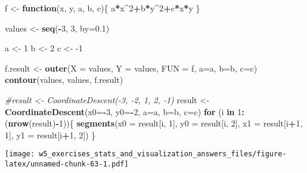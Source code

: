 \documentclass[]{article}
\newenvironment{Shaded}{\begin{snugshade}}{\end{snugshade}}
\newcommand{\CommentTok}[1]{\textcolor[rgb]{0.56,0.35,0.01}{\textit{#1}}}
\newcommand{\ControlFlowTok}[1]{\textcolor[rgb]{0.13,0.29,0.53}{\textbf{#1}}}
\newcommand{\DataTypeTok}[1]{\textcolor[rgb]{0.13,0.29,0.53}{#1}}
\newcommand{\DecValTok}[1]{\textcolor[rgb]{0.00,0.00,0.81}{#1}}
\newcommand{\FloatTok}[1]{\textcolor[rgb]{0.00,0.00,0.81}{#1}}
\newcommand{\KeywordTok}[1]{\textcolor[rgb]{0.13,0.29,0.53}{\textbf{#1}}}
\newcommand{\NormalTok}[1]{#1}
\newcommand{\OperatorTok}[1]{\textcolor[rgb]{0.81,0.36,0.00}{\textbf{#1}}}
\newcommand{\StringTok}[1]{\textcolor[rgb]{0.31,0.60,0.02}{#1}}
\begin{document}
\begin{Shaded}
\begin{Highlighting}[]
\NormalTok{f <-}\StringTok{ }\ControlFlowTok{function}\NormalTok{(x, y, a, b, c)\{}
\NormalTok{  a}\OperatorTok{*}\NormalTok{x}\OperatorTok{^}\DecValTok{2}\OperatorTok{+}\NormalTok{b}\OperatorTok{*}\NormalTok{y}\OperatorTok{^}\DecValTok{2}\OperatorTok{+}\NormalTok{c}\OperatorTok{*}\NormalTok{x}\OperatorTok{*}\NormalTok{y}
\NormalTok{\}}

\NormalTok{values <-}\StringTok{ }\KeywordTok{seq}\NormalTok{(}\OperatorTok{-}\DecValTok{3}\NormalTok{, }\DecValTok{3}\NormalTok{, }\DataTypeTok{by=}\FloatTok{0.1}\NormalTok{)}
\end{Highlighting}
\end{Shaded}

\begin{Shaded}
\begin{Highlighting}[]
\NormalTok{a <-}\StringTok{ }\DecValTok{1} 
\NormalTok{b <-}\StringTok{ }\DecValTok{2}
\NormalTok{c <-}\StringTok{ }\DecValTok{-1}

\NormalTok{f.result <-}\StringTok{ }\KeywordTok{outer}\NormalTok{(}\DataTypeTok{X =}\NormalTok{ values, }\DataTypeTok{Y =}\NormalTok{ values, }\DataTypeTok{FUN =}\NormalTok{ f, }\DataTypeTok{a=}\NormalTok{a, }\DataTypeTok{b=}\NormalTok{b, }\DataTypeTok{c=}\NormalTok{c)}
\KeywordTok{contour}\NormalTok{(values, values, f.result)}

\CommentTok{#result <- CoordinateDescent(-3, -2, 1, 2, -1)}
\NormalTok{result <-}\StringTok{ }\KeywordTok{CoordinateDescent}\NormalTok{(}\DataTypeTok{x0=}\OperatorTok{-}\DecValTok{3}\NormalTok{, }\DataTypeTok{y0=}\OperatorTok{-}\DecValTok{2}\NormalTok{, }\DataTypeTok{a=}\NormalTok{a, }\DataTypeTok{b=}\NormalTok{b, }\DataTypeTok{c=}\NormalTok{c)}
\ControlFlowTok{for}\NormalTok{ (i }\ControlFlowTok{in} \DecValTok{1}\OperatorTok{:}\NormalTok{(}\KeywordTok{nrow}\NormalTok{(result)}\OperatorTok{-}\DecValTok{1}\NormalTok{))\{}
  \KeywordTok{segments}\NormalTok{(}\DataTypeTok{x0 =}\NormalTok{ result[i, }\DecValTok{1}\NormalTok{], }\DataTypeTok{y0 =}\NormalTok{ result[i, }\DecValTok{2}\NormalTok{], }\DataTypeTok{x1 =}\NormalTok{ result[i}\OperatorTok{+}\DecValTok{1}\NormalTok{, }\DecValTok{1}\NormalTok{], }\DataTypeTok{y1 =}\NormalTok{ result[i}\OperatorTok{+}\DecValTok{1}\NormalTok{, }\DecValTok{2}\NormalTok{])}
\NormalTok{\}}
\end{Highlighting}
\end{Shaded}

\texttt{[image: w5\_exercises\_stats\_and\_visualization\_answers\_files/figure-latex/unnamed-chunk-63-1.pdf]}
\end{document}
